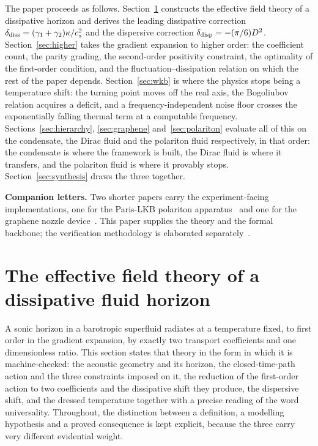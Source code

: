 \documentclass[aps,prd,reprint,nofootinbib,superscriptaddress]{revtex4-2}
\begin{document}
The paper proceeds as follows. Section~\ref{sec:eft} constructs the
effective field theory of a dissipative horizon and derives the leading
dissipative correction $\delta_{\rm diss} = (\gamma_1+\gamma_2)\kappa/c_s^2$
and the dispersive correction $\delta_{\rm disp} = -(\pi/6)D^2$.
Section~\ref{sec:higher} takes the gradient expansion to higher order:
the coefficient count, the parity grading, the second-order positivity
constraint, the optimality of the first-order condition, and the
fluctuation--dissipation relation on which the rest of the paper
depends. Section~\ref{sec:wkb} is where the physics stops being a
temperature shift: the turning point moves off the real axis, the
Bogoliubov relation acquires a deficit, and a frequency-independent
noise floor crosses the exponentially falling thermal term at a
computable frequency. Sections~\ref{sec:hierarchy},
\ref{sec:graphene} and~\ref{sec:polariton} evaluate all of this on the
condensate, the Dirac fluid and the polariton fluid respectively, in
that order: the condensate is where the framework is built, the Dirac
fluid is where it transfers, and the polariton fluid is where it
provably stops. Section~\ref{sec:synthesis} draws the three together.

\textbf{Companion letters.} Two shorter papers carry the
experiment-facing implementations, one for the Paris-LKB polariton
apparatus~\cite{Roehm2026E1} and one for the graphene nozzle
device~\cite{Roehm2026E2}. This paper supplies the theory and the
formal backbone; the verification methodology is elaborated
separately~\cite{Roehm2026I1}.

\section{The effective field theory of a dissipative fluid horizon}
\label{sec:eft}

A sonic horizon in a barotropic superfluid radiates at a temperature
fixed, to first order in the gradient expansion, by exactly two transport
coefficients and one dimensionless ratio. This section states that theory
in the form in which it is machine-checked: the acoustic geometry and its
horizon, the closed-time-path action and the three constraints imposed on
it, the reduction of the first-order action to two coefficients and the
dissipative shift they produce, the dispersive shift, and the dressed
temperature together with a precise reading of the word universality.
Throughout, the distinction between a definition, a modelling hypothesis
and a proved consequence is kept explicit, because the three carry very
different evidential weight.
\end{document}
